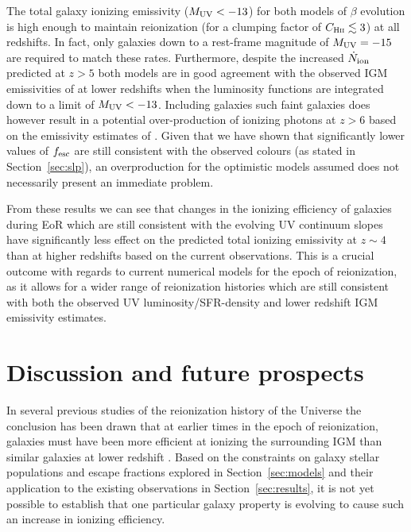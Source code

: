 The total galaxy ionizing emissivity ($M_{\rm{UV}} < -13$) for both models of $\beta$ evolution is high enough to maintain reionization (for a clumping factor of $C_{\textsc{Hii}} \lesssim 3$) at all redshifts. In fact, only galaxies down to a rest-frame magnitude of $M_{\rm{UV}} = -15$ are required to match these rates. Furthermore, despite the increased $\dot{N}_{\rm{ion}}$ predicted at $z > 5$ both models are in good agreement with the observed IGM emissivities of \citet{Becker:2013hc} at lower redshifts when the luminosity functions are integrated down to a limit of $M_{\rm{UV}} < -13$. Including galaxies such faint galaxies does however result in a potential over-production of ionizing photons at $z> 6$ based on the emissivity estimates of \citet{Bouwens:2015tm}. Given that we have shown that significantly lower values of $f_{\rm{esc}}$ are still consistent with the observed colours (as stated in Section~\ref{sec:slp}), an overproduction for the optimistic models assumed does not necessarily present an immediate problem.

From these results we can see that changes in the ionizing efficiency of galaxies during EoR which are still consistent with the evolving UV continuum slopes have significantly less effect on the predicted total ionizing emissivity at $z\sim4$ than at higher redshifts based on the current observations. This is a crucial outcome with regards to current numerical models for the epoch of reionization, as it allows for a wider range of reionization histories which are still consistent with both the observed UV luminosity/SFR-density and lower redshift IGM emissivity estimates. 

\section{Discussion and future prospects}\label{sec:discussion}
In several previous studies of the reionization history of the Universe the conclusion has been drawn that at earlier times in the epoch of reionization, galaxies must have been more efficient at ionizing the surrounding IGM than similar galaxies at lower redshift \citep{Becker:2013hc,Kuhlen:2012ka,Robertson:2013ji}. Based on the constraints on galaxy stellar populations and escape fractions explored in Section~\ref{sec:models} and their application to the existing observations in Section~\ref{sec:results}, it is not yet possible to establish that one particular galaxy property is evolving to cause such an increase in ionizing efficiency. 

